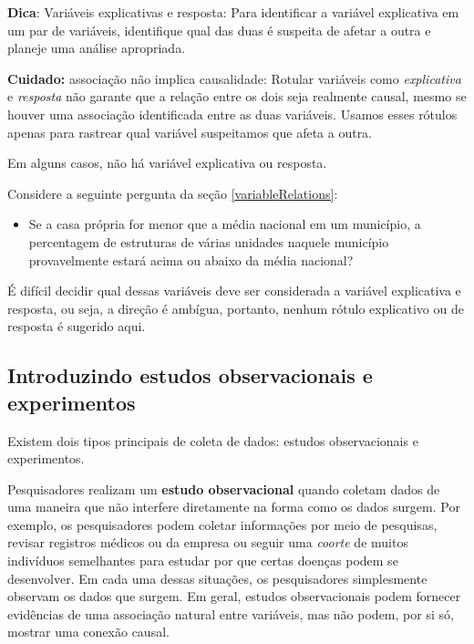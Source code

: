 \documentclass[
]{book}
\providecommand{\tightlist}{%
  \setlength{\itemsep}{0pt}\setlength{\parskip}{0pt}}
\theoremstyle{definition}
\theoremstyle{definition}
\theoremstyle{definition}
\theoremstyle{definition}
\theoremstyle{remark}
\begin{document}
\textbf{Dica}: Variáveis explicativas e resposta: Para identificar a variável explicativa em um par de variáveis, identifique qual das duas é suspeita de afetar a outra e planeje uma análise apropriada.

\textbf{Cuidado:} associação não implica causalidade: Rotular variáveis como \emph{explicativa} e \emph{resposta} não garante que a relação entre os dois seja realmente causal, mesmo se houver uma associação identificada entre as duas variáveis. Usamos esses rótulos apenas para rastrear qual variável suspeitamos que afeta a outra.

Em alguns casos, não há variável explicativa ou resposta.

Considere a seguinte pergunta da seção \ref{variableRelations}:

\begin{itemize}
\tightlist
\item
  Se a casa própria for menor que a média nacional em um município, a percentagem de estruturas de várias unidades naquele município provavelmente estará acima ou abaixo da média nacional?
\end{itemize}

É difícil decidir qual dessas variáveis deve ser considerada a variável explicativa e resposta, ou seja, a direção é ambígua, portanto, nenhum rótulo explicativo ou de resposta é sugerido aqui.

\hypertarget{introObservationalExperimentStudies}{%
\subsection{Introduzindo estudos observacionais e experimentos}\label{introObservationalExperimentStudies}}

Existem dois tipos principais de coleta de dados: estudos observacionais e experimentos.

Pesquisadores realizam um \textbf{estudo observacional} quando coletam dados de uma maneira que não interfere diretamente na forma como os dados surgem. Por exemplo, os pesquisadores podem coletar informações por meio de pesquisas, revisar registros médicos ou da empresa ou seguir uma \emph{coorte} de muitos indivíduos semelhantes para estudar por que certas doenças podem se desenvolver. Em cada uma dessas situações, os pesquisadores simplesmente observam os dados que surgem. Em geral, estudos observacionais podem fornecer evidências de uma associação natural entre variáveis, mas não podem, por si só, mostrar uma conexão causal.
\end{document}
